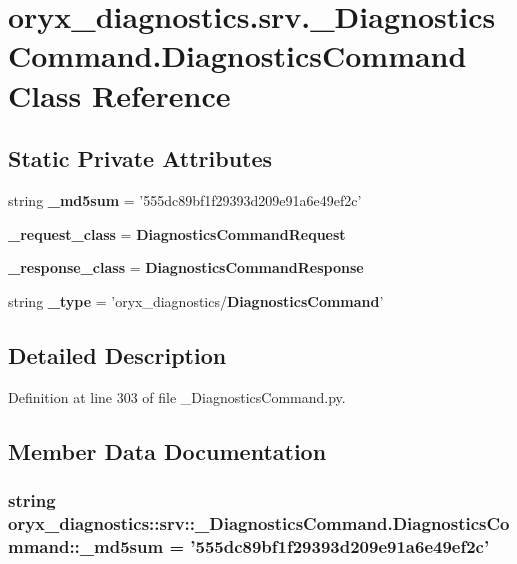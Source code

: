 \section{oryx\-\_\-diagnostics.\-srv.\-\_\-\-Diagnostics\-Command.\-Diagnostics\-Command \-Class \-Reference}
\label{classoryx__diagnostics_1_1srv_1_1__DiagnosticsCommand_1_1DiagnosticsCommand}
\subsection*{\-Static \-Private \-Attributes}
\begin{DoxyCompactItemize}
\item 
string {\bf \-\_\-md5sum} = '555dc89bf1f29393d209e91a6e49ef2c'
\item 
{\bf \-\_\-request\-\_\-class} = {\bf \-Diagnostics\-Command\-Request}
\item 
{\bf \-\_\-response\-\_\-class} = {\bf \-Diagnostics\-Command\-Response}
\item 
string {\bf \-\_\-type} = 'oryx\-\_\-diagnostics/{\bf \-Diagnostics\-Command}'
\end{DoxyCompactItemize}


\subsection{\-Detailed \-Description}


\-Definition at line 303 of file \-\_\-\-Diagnostics\-Command.\-py.



\subsection{\-Member \-Data \-Documentation}
\subsubsection[{\-\_\-md5sum}]{\setlength{\rightskip}{0pt plus 5cm}string {\bf oryx\-\_\-diagnostics\-::srv\-::\-\_\-\-Diagnostics\-Command.\-Diagnostics\-Command\-::\-\_\-md5sum} = '555dc89bf1f29393d209e91a6e49ef2c'\hspace{0.3cm}{\ttfamily  [static, private]}}\label{classoryx__diagnostics_1_1srv_1_1__DiagnosticsCommand_1_1DiagnosticsCommand_a3e08feb7c8527ee7e43f700b9b38c694}



